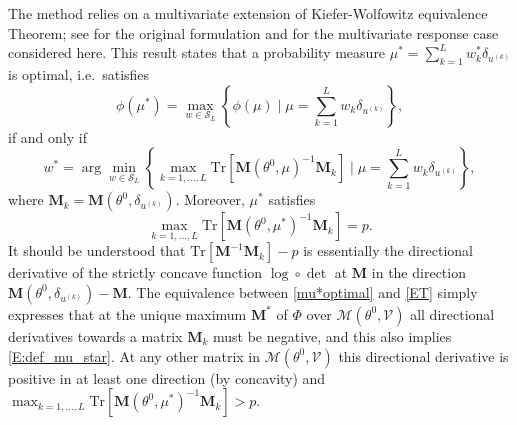 \documentclass[twocolumn]{autart}
\newcommand{\Luc}{\color{magenta} }
\theoremstyle{definition}
\theoremstyle{remark}
\newcommand{\Tr}{\mathrm{Tr}}
\newcommand{\V}{\mathcal{V}}
\newcommand{\Mb}{\mathbf{M}}
\renewcommand{\S}{\mathcal{S}}
\begin{document}
The method relies on a multivariate extension of Kiefer-Wolfowitz equivalence Theorem; see \cite{KieferW60} for the original formulation and \cite{HarmanT2009} for the multivariate response case considered here. 
This result states that a probability measure $\mu^*=\sum_{k=1}^L w_k^*\delta_{u^{(k)}}$ is optimal, i.e.\ satisfies 
\begin{equation}\label{mu*optimal}
\phi(\mu^*)=\max_{w\in \S_L}
\left\{ \phi(\mu) \mid \mu=\sum_{k=1}^L w_k\delta_{u^{(k)}}\right\},
\end{equation}
if and only if 
\begin{equation}\label{ET}
w^*=\arg\min_{w\in \S_L}
\left\{
\max_{k=1,\dots ,L} 
\Tr
\left[
\Mb(\theta^0,\mu)^{-1}
\Mb_k
\right]
\mid 
\mu=\sum_{k=1}^L w_k\delta_{u^{(k)}}
\right\},
\end{equation}
where  $\Mb_k=\Mb(\theta^0,\delta_{u^{(k)}})$. Moreover, $\mu^*$ satisfies 
\begin{equation}\label{E:def_mu_star}
\max_{k=1,\dots ,L} 
\Tr
\left[
\Mb(\theta^0,\mu^*)^{-1}
\Mb_k
\right]=p.
\end{equation}
%
It should be understood that 
$
\Tr
\left[
\Mb^{-1}
\Mb_k
\right]- p$ is essentially the directional derivative of the strictly concave function $\log \circ \det$ at $\Mb$ in the direction $\Mb(\theta^0,\delta_{u^{(k)}})-\Mb$.
{\Luc The equivalence between \eqref{mu*optimal} and \eqref{ET} simply expresses that at
the unique maximum $\Mb^*$ of $\Phi$ over $\mathcal{M}(\theta^0, \V)$ all directional derivatives towards a matrix $\Mb_k$ must be negative, and this also implies 
\eqref{E:def_mu_star}. At any other matrix in $\mathcal{M}(\theta^0, \V)$ this directional derivative is positive in at least one direction (by concavity) and $\max_{k=1,\dots, L} 
\Tr
\left[
\Mb(\theta^0,\mu^*)^{-1}
\Mb_k
\right]>p$.  }
\end{document}
